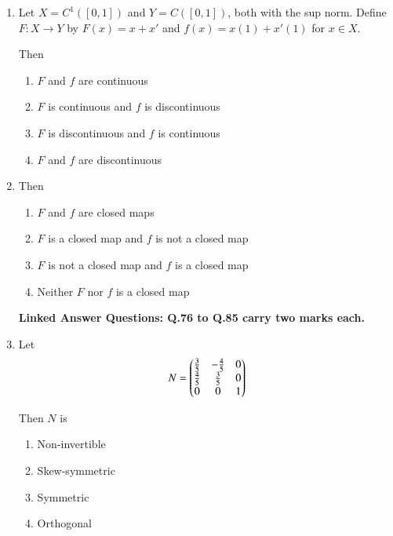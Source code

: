 \documentclass[journal,12pt,onecolumn]{IEEEtran}
\theoremstyle{remark}
\begin{document}
\begin{enumerate}
\item Let \( X = C^1([0,1]) \) and \( Y = C([0,1]) \), both with the sup norm. Define \( F: X \to Y \) by \( F(x) = x + x' \) and  
\( f(x) = x(1) + x'(1) \) for \( x \in X \).

 Then
\\[-0.3em]\makebox[\textwidth][r]{\textit{[GATE EE 2025]}}

\begin{multicols}{2}
\begin{enumerate}[label=(\Alph*)]
\item \( F \) and \( f \) are continuous
\item \( F \) is continuous and \( f \) is discontinuous
\item \( F \) is discontinuous and \( f \) is continuous
\item \( F \) and \( f \) are discontinuous
\end{enumerate}
\end{multicols}





\item Then
\\[-0.3em]\makebox[\textwidth][r]{\textit{[GATE EE 2025]}}

\begin{multicols}{2}
\begin{enumerate}[label=(\Alph*)]
\item \(F\) and \(f\) are closed maps
\item \(F\) is a closed map and \(f\) is not a closed map
\item \(F\) is not a closed map and \(f\) is a closed map
\item Neither \(F\) nor \(f\) is a closed map
\end{enumerate}
\end{multicols}

\textbf{Linked Answer Questions: Q.76 to Q.85 carry two marks each.}


\item Let  
\[
N = \begin{pmatrix}\frac{3}{5} & -\frac{4}{5} & 0 \\ \frac{4}{5} & \frac{3}{5} & 0 \\ 0 & 0 & 1\end{pmatrix}
\]

 Then \(N\) is
\\[-0.3em]\makebox[\textwidth][r]{\textit{[GATE EE 2025]}}

\begin{multicols}{2}
\begin{enumerate}[label=(\Alph*)]
\item Non-invertible
\item Skew-symmetric
\item Symmetric
\item Orthogonal
\end{enumerate}
\end{multicols}


\end{enumerate}
\end{document}

